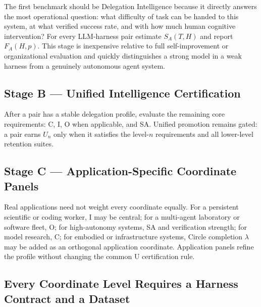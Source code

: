 \documentclass[11pt]{article}
\theoremstyle{definition}
\newcommand{\SA}{\ensuremath{S_A(T,H)}}
\newcommand{\FA}{\ensuremath{F_A(H,p)}}
\begin{document}
The first benchmark should be Delegation Intelligence because it directly answers the most operational question: what difficulty of task can be handed to this system, at what verified success rate, and with how much human cognitive intervention? For every LLM-harness pair estimate \SA{} and report \FA{}. This stage is inexpensive relative to full self-improvement or organizational evaluation and quickly distinguishes a strong model in a weak harness from a genuinely autonomous agent system.

\subsection{Stage B --- Unified Intelligence Certification}

After a pair has a stable delegation profile, evaluate the remaining core requirements: C, I, O when applicable, and SA. Unified promotion remains gated: a pair earns $U_n$ only when it satisfies the level-$n$ requirements and all lower-level retention suites.

\subsection{Stage C --- Application-Specific Coordinate Panels}

Real applications need not weight every coordinate equally. For a persistent scientific or coding worker, I may be central; for a multi-agent laboratory or software fleet, O; for high-autonomy systems, SA and verification strength; for model research, C; for embodied or infrastructure systems, Circle completion $\lambda$ may be added as an orthogonal application coordinate. Application panels refine the profile without changing the common U certification rule.

\subsection{Every Coordinate Level Requires a Harness Contract and a Dataset}
\end{document}
